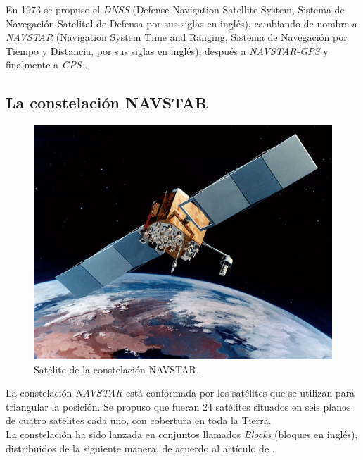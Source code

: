 En 1973 se propuso el \textit{DNSS} (Defense Navigation Satellite System, Sistema de Navegación Satelital de Defensa por sus siglas en inglés), cambiando de nombre a \textit{NAVSTAR} (Navigation System Time and Ranging, Sistema de Navegación por Tiempo y Distancia, por sus siglas en inglés), después a \textit{NAVSTAR-GPS} y finalmente a \textit{GPS} \citep{termal2014prototipo}.

\subsection{La constelación NAVSTAR}

\begin{figure}[H]
\centering
\includegraphics[scale=0.95]{Figures/Navstar}
\caption[Satélite de la constelación NAVSTAR.]{Satélite de la constelación NAVSTAR\footnotemark.}
\label{fig:NAV}
\end{figure}


La constelación \textit{NAVSTAR} está conformada por los satélites que se utilizan para triangular la posición. Se propuso que fueran 24 satélites situados en seis planos de cuatro satélites cada uno, con cobertura en toda la Tierra. \\

La constelación ha sido lanzada en conjuntos llamados \textit{Blocks} (bloques en inglés), distribuidos de la siguiente manera, de acuerdo al artículo de \cite{termal2014prototipo}.

